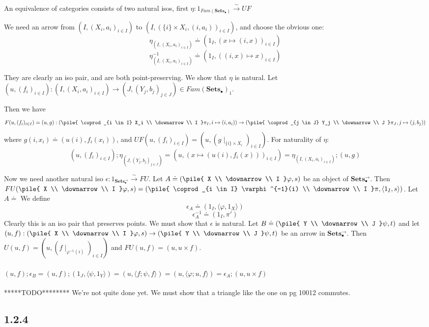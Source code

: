 \documentclass{article}
\newcommand{\mbf}{\mathbf}
\newcommand{\vrt}[2]{
\pile{
#1 \\
\downarrow \\
#2
}
}
\begin{document}
An equivalence of categories consists of two natural isos, first $\eta : 1_{Fam(\mbf{Sets_{\bullet}})} \overset{\sim}{\longrightarrow} UF$

We need an arrow from $(I, (X_i, a_i)_{i \in I})$ to $(I, (\{i\} \times X_i, (i,a_i))_{i \in I})$, and choose the obvious one:
$$\eta_{(I, (X_i, a_i)_{i \in I})} \doteq (1_I, (x \mapsto (i,x))_{i \in I})$$
$$\eta^{-1}_{(I, (X_i, a_i)_{i \in I})} \doteq (1_I, ((i,x) \mapsto x)_{i \in I})$$

They are clearly an iso pair, and are both point-preserving. We show that $\eta$ is natural.
Let $(u,(f_i)_{i \in I}) : (I, (X_i,a_i)_{i \in I}) \to (J, (Y_j, b_j)_{j \in J}) \in Fam(\mbf{Sets_\bullet})_1$. 

Then we have 
$$F(u,(f_i)_{i \in I}) = (u, g)  : (\vrt{\coprod_{i \in I} X_i}{I}\pi_I, i \mapsto (i, a_i)) \to 
  (\vrt{\coprod_{j \in J} Y_j}{J}\pi_J, j \mapsto (j, b_j))$$ %
where $g(i,x_i) \doteq (u(i),f_i(x_i))$,
and
$UF(u,(f_i)_{i \in I}) = (u, (g \mid_{\{i\} \times X_i})_{i \in I})$. %
For naturality of $\eta$:
$$(u,(f_i)_{i \in I});\eta_{(J, (Y_j, b_j)_{j \in J})} = (u, (x \mapsto (u(i), f_i(x)))_{i \in I}) = 
  \eta_{(I, (X_i,a_i)_{i \in I})};(u,g)$$ 

Now we need another natural iso $\epsilon : 1_{\mbf{Sets_{\bullet}^{\to}}} \overset{\sim}{\longrightarrow} FU$.
Let $A \doteq (\vrt{X}{I}\varphi,s)$ be an object of $\mbf{Sets_{\bullet}^{\to}}$.
Then $FU(\vrt{X}{I}\varphi,s) = (\vrt{\coprod_{i \in I} \varphi^{-1}(i)}{I}\pi, \langle 1_I, s \rangle)$.
Let $A \doteq $ We define
$$\epsilon_{A} \doteq (1_I, \langle \varphi, 1_X\rangle) $$
$$\epsilon^{-1}_A \doteq (1_I, \pi') $$
Clearly this is an iso pair that preserves points. We must show that $\epsilon$ is natural.
Let $B \doteq (\vrt{Y}{J}\psi,t)$ and let $(u,f) : (\vrt{X}{I}\varphi,s) \to (\vrt{Y}{J}\psi,t)$ be an arrow in 
$\mbf{Sets^{\to}_{\bullet}}$.
Then $U(u,f) = (u,(f\mid_{\varphi^{-1}(i)})_{i \in I})$ and $FU(u,f) = (u, u \times f)$.\\~\\
$(u,f);\epsilon_B = (u,f);(1_J, \langle \psi, 1_Y \rangle) = (u, \langle f;\psi, f \rangle)
= (u, \langle \varphi;u, f \rangle) = \epsilon_A;(u, u \times f)$
\\~\\
*****TODO********
We're not quite done yet. We must show that a triangle like the one on pg 10012 commutes.

\subsection*{1.2.4}
\end{document}
